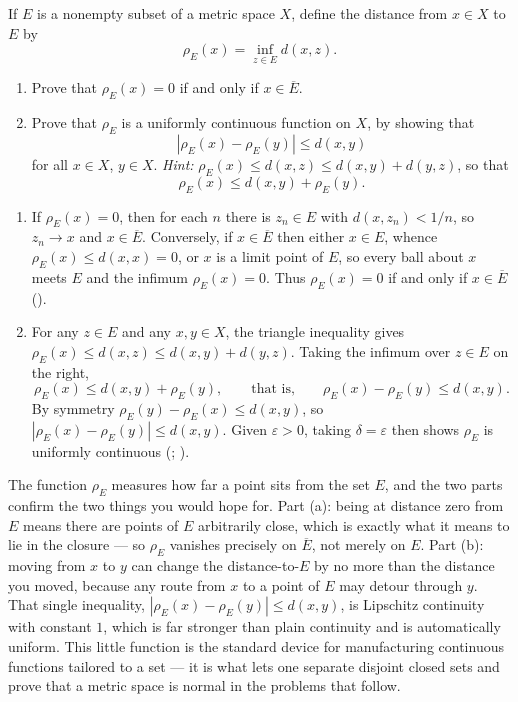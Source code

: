 \documentclass[main.tex]{subfiles}
\begin{document}
If $E$ is a nonempty subset of a metric space $X$, define the distance from $x \in X$ to $E$ by
\[
\rho_{E}(x) = \inf_{z \in E} d(x, z).
\]
\begin{enumerate}
  \item Prove that $\rho_{E}(x) = 0$ if and only if $x \in \overline{E}$.
  \item Prove that $\rho_{E}$ is a uniformly continuous function on $X$, by showing that
  \[
  |\rho_{E}(x) - \rho_{E}(y)| \leq d(x, y)
  \]
  for all $x \in X$, $y \in X$. \textit{Hint:} $\rho_{E}(x) \leq d(x, z) \leq d(x, y) + d(y, z)$, so that
  \[
  \rho_{E}(x) \leq d(x, y) + \rho_{E}(y).
  \]
\end{enumerate}
\begin{Solution}
\begin{enumerate}
\item If $\rho_{E}(x) = 0$, then for each $n$ there is $z_{n} \in E$ with $d(x, z_{n}) < 1/n$, so $z_{n} \to x$ and $x \in \overline{E}$. Conversely, if $x \in \overline{E}$ then either $x \in E$, whence $\rho_{E}(x) \le d(x, x) = 0$, or $x$ is a limit point of $E$, so every ball about $x$ meets $E$ and the infimum $\rho_{E}(x) = 0$. Thus $\rho_{E}(x) = 0$ if and only if $x \in \overline{E}$ ().

\item For any $z \in E$ and any $x, y \in X$, the triangle inequality gives $\rho_{E}(x) \le d(x, z) \le d(x, y) + d(y, z)$. Taking the infimum over $z \in E$ on the right,
\[
\rho_{E}(x) \le d(x, y) + \rho_{E}(y), \qquad \text{that is,} \qquad \rho_{E}(x) - \rho_{E}(y) \le d(x, y).
\]
By symmetry $\rho_{E}(y) - \rho_{E}(x) \le d(x, y)$, so $|\rho_{E}(x) - \rho_{E}(y)| \le d(x, y)$. Given $\varepsilon > 0$, taking $\delta = \varepsilon$ then shows $\rho_{E}$ is uniformly continuous (; ).
\end{enumerate}
\end{Solution}
\begin{Reflection}
The function $\rho_{E}$ measures how far a point sits from the set $E$, and the two parts confirm the two things you would hope for. Part (a): being at distance zero from $E$ means there are points of $E$ arbitrarily close, which is exactly what it means to lie in the closure --- so $\rho_{E}$ vanishes precisely on $\overline{E}$, not merely on $E$. Part (b): moving from $x$ to $y$ can change the distance-to-$E$ by no more than the distance you moved, because any route from $x$ to a point of $E$ may detour through $y$. That single inequality, $|\rho_{E}(x) - \rho_{E}(y)| \le d(x, y)$, is Lipschitz continuity with constant $1$, which is far stronger than plain continuity and is automatically uniform. This little function is the standard device for manufacturing continuous functions tailored to a set --- it is what lets one separate disjoint closed sets and prove that a metric space is normal in the problems that follow.
\end{Reflection}
\end{document}
